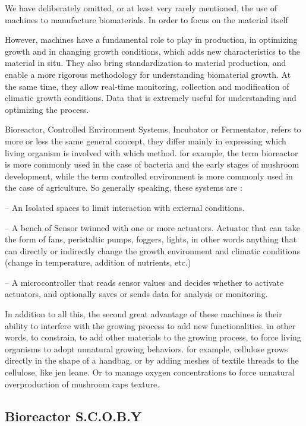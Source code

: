 We have deliberately omitted, or at least very rarely mentioned, the use of machines to manufacture biomaterials. In order to focus on the material itself 
 
However, machines have a fundamental role to play in production, in optimizing growth and in changing growth conditions, which adds new characteristics to the material in situ.  
They also bring standardization to material production, and enable a more rigorous methodology for understanding biomaterial growth.
At the same time, they allow real-time monitoring, collection and modification of climatic growth conditions. Data that is extremely useful for understanding and optimizing the process.

Bioreactor, Controlled Environment Systems, Incubator or Fermentator, refers to more or less the same general concept, they differ mainly in expressing which living organism is involved with which method. for example, the term bioreactor is more commonly used in the case of bacteria and the early stages of mushroom development, while the term controlled environment is more commonly used in the case of agriculture.
So generally speaking, these systems are :

\- -- An Isolated spaces to limit interaction with external conditions.

\- -- A bench of Sensor twinned with one or more actuators. Actuator that can take the form of fans, peristaltic pumps, foggers, lights, in other words anything that can directly or indirectly change the growth environment and climatic conditions (change in temperature, addition of nutrients, etc.) 

\- -- A microcontroller that reads sensor values and decides whether to activate actuators, and optionally saves or sends data for analysis or monitoring. 

In addition to all this, the second great advantage of these machines is their ability to interfere with the growing process to add new functionalities. in other words, to constrain, to add other materials to the growing process, to force living organisms to adopt unnatural growing behaviors. for example, cellulose grows directly in the shape of a handbag, or by adding meshes of textile threads to the cellulose, like jen leane.   
Or to manage oxygen concentrations to force unnatural overproduction of mushroom caps texture.

\subsection{Bioreactor S.C.O.B.Y}

